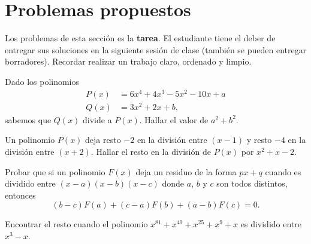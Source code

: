 \section{Problemas propuestos}

Los problemas de esta sección es la \textbf{tarea}.
El estudiante tiene el deber de entregar sus soluciones en la siguiente sesión de clase (también se pueden entregar borradores).
Recordar realizar un trabajo claro, ordenado y limpio.

\showLine
\begin{multicols}{2}

    \begin{exercise}
        Dado los polinomios
        \begin{align*}
            P(x) &= 6x^4 + 4x^3 - 5x^2 - 10x + a \\
            Q(x) &= 3 x^2 + 2x + b,
        \end{align*}
        sabemos que $Q(x)$ divide a $P(x)$.
        Hallar el valor de $a^2 + b^2$.
    \end{exercise}

    \begin{exercise}
        Un polinomio $P(x)$ deja resto $-2$ en la división entre $(x - 1)$ y resto $-4$ en la división entre $(x + 2)$.
        Hallar el resto en la división de $P(x)$ por $x^2 + x - 2$.
    \end{exercise}

    \begin{exercise}
        Probar que si un polinomio $F(x)$ deja un residuo de la forma $px + q$ cuando es dividido entre $(x - a)(x - b)(x - c)$
        donde $a$, $b$ y $c$ son todos distintos, entonces
        \[
            (b - c)F(a) + (c - a)F(b) + (a - b)F(c) = 0.
        \]
    \end{exercise}

    \begin{problem}
        Encontrar el resto cuando el polinomio $x^{81} + x^{49} + x^{25} + x^9 + x$ es dividido entre $x^3 - x$.
    \end{problem}
\end{multicols}